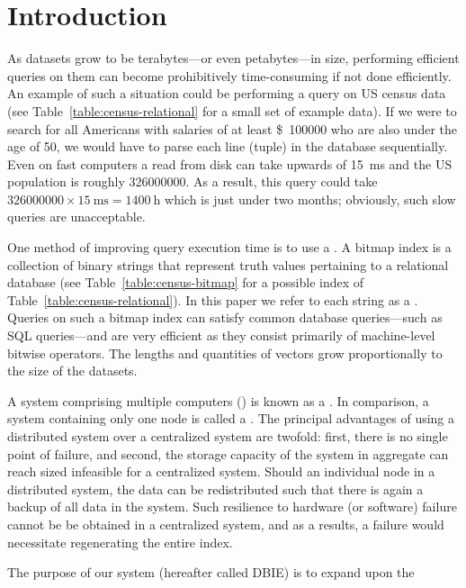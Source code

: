 \section{Introduction}
As datasets grow to be terabytes---or even petabytes---in size, performing
efficient queries on them can become prohibitively time-consuming if not done
efficiently. An example of such a situation could be performing a query on US
census data (see Table~\ref{table:census-relational} for a small set of example
data). If we were to search for all Americans with salaries of at least
\SI{100000}[\$]{} who are also under the age of 50, we would have to parse each
line (tuple) in the database sequentially. Even on fast computers a read from
disk can take upwards of \SI{15}{\milli\second} and the US population is
roughly \num{326000000}. As a result, this query could take
\(\num{326 000 000} \times \SI{15}{\milli\second} = \SI{1400}{\hour}\)
which is just under two months; obviously, such slow queries are unacceptable.
\par
One method of improving query execution time is to use a . A
bitmap index is a collection of binary strings that represent truth values
pertaining to a relational database (see Table~\ref{table:census-bitmap} for a
possible index of Table~\ref{table:census-relational}). In this paper we refer
to each string as a . Queries on such a bitmap index can
satisfy common database queries---such as SQL 
queries---and are very efficient as they consist primarily of machine-level
bitwise operators. The lengths and quantities of vectors grow proportionally to
the size of the datasets.
\par
A system comprising multiple computers () is known as a
. In comparison, a system containing only one node is
called a . The principal advantages of using a
distributed system over a centralized system are twofold: first, there is no
single point of failure, and second, the storage capacity of the system in
aggregate can reach sized infeasible for a centralized system. Should an
individual node in a distributed system, the data can be redistributed such
that there is again a backup of all data in the system. Such resilience to
hardware (or software) failure cannot be be obtained in a centralized system,
and as a results, a failure would necessitate regenerating the entire index.
\par
The purpose of our system (hereafter called DBIE) is to expand upon the
